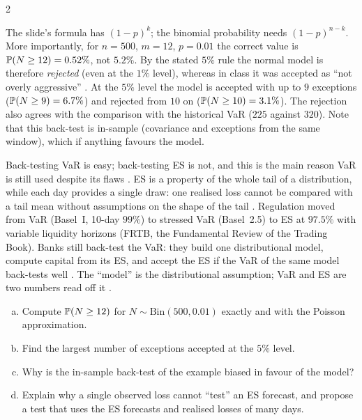 \begin{paracol}{2}
\begin{coursenote}
The slide's formula has $(1-p)^k$; the binomial probability needs $(1-p)^{n-k}$. More importantly, for
$n=500$, $m=12$, $p=0.01$ the correct value is $\mathbb{P}(N\ge12)=0.52\%$, not $5.2\%$. By the stated $5\%$ rule the
normal model is therefore \emph{rejected} (even at the $1\%$ level), whereas in class it was accepted as ``not
overly aggressive'' . At the $5\%$ level the model is accepted with up to $9$ exceptions
($\mathbb{P}(N\ge9)=6.7\%$) and rejected from $10$ on ($\mathbb{P}(N\ge10)=3.1\%$). The rejection also agrees with the
comparison with the historical VaR ($225$ against $320$). Note that this back-test is in-sample (covariance and
exceptions from the same window), which if anything favours the model.
\end{coursenote}

Back-testing VaR is easy; back-testing ES is not, and this is the main reason VaR is still used despite its flaws
. ES is a property of the whole tail of a distribution, while each day provides a single draw: one
realised loss cannot be compared with a tail mean without assumptions on the shape of the tail
. Regulation moved from VaR (Basel~I, 10-day $99\%$) to stressed VaR (Basel~2.5) to ES at
$97.5\%$ with variable liquidity horizons (FRTB, the Fundamental Review of the Trading Book). Banks still
back-test the VaR: they build one distributional model, compute capital from its ES, and accept the ES if the VaR of
the same model back-tests well . The ``model'' is the distributional assumption; VaR and ES are
two numbers read off it .

\begin{exercise}
\leavevmode
\begin{enumerate}[(a)]
  \item Compute $\mathbb{P}(N\ge12)$ for $N\sim\mathrm{Bin}(500,0.01)$ exactly and with the Poisson approximation.
  \item Find the
      largest number of exceptions accepted at the $5\%$ level.
  \item Why is the in-sample back-test of the example biased in
      favour of the model?
  \item Explain why a single observed loss cannot ``test'' an ES forecast, and propose a test that
      uses the ES forecasts and realised losses of many days.
\end{enumerate}
\end{exercise}


\end{paracol}
